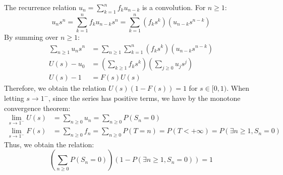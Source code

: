 The recurrence relation $u_n = \sum_{k=1}^n f_k u_{n-k}$ is a convolution. For $n \ge 1$:%
\begin{equation*}
    u_n s^n = \sum_{k=1}^n f_k u_{n-k} s^n = \sum_{k=1}^n (f_k s^k)(u_{n-k}s^{n-k})
\end{equation*}%
By summing over $n \ge 1$:%
\begin{align*}
    \sum_{n \ge 1} u_n s^n &= \sum_{n \ge 1} \sum_{k=1}^n (f_k s^k)(u_{n-k}s^{n-k}) \\
    U(s) - u_0 &= \left(\sum_{k \ge 1} f_k s^k\right) \left(\sum_{j \ge 0} u_j s^j\right) \\
    U(s) - 1 &= F(s) U(s)
\end{align*}%
Therefore, we obtain the relation $U(s)(1 - F(s)) = 1$ for $s \in [0,1)$.
When letting $s \to 1^-$, since the series has positive terms, we have by the monotone convergence theorem:%
\begin{align*}
    \lim_{s \to 1^-} U(s) &= \sum_{n \ge 0} u_n = \sum_{n \ge 0} P(S_n=0) \\
    \lim_{s \to 1^-} F(s) &= \sum_{n \ge 0} f_n = \sum_{n \ge 0} P(T=n) = P(T < +\infty) = P(\exists n \ge 1, S_n=0)
\end{align*}%
Thus, we obtain the relation:%
\begin{equation*}
    \left(\sum_{n \ge 0} P(S_n=0)\right) \left(1 - P(\exists n \ge 1, S_n=0)\right) = 1
\end{equation*}%

